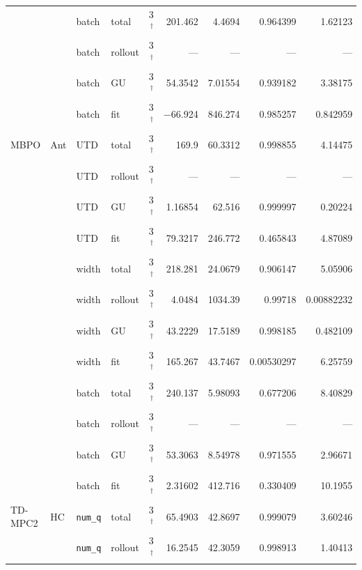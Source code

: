 {\begin{longtable}{@{}llllrrrrr@{}}
     &  & batch & total & \num{3}$^{\dagger}$ & \num{201.462} & \num{4.4694} & \num{0.964399} & \num{1.62123} \\
     &  & batch & rollout & \num{3}$^{\dagger}$ & --- & --- & --- & --- \\
     &  & batch & GU & \num{3}$^{\dagger}$ & \num{54.3542} & \num{7.01554} & \num{0.939182} & \num{3.38175} \\
     &  & batch & fit & \num{3}$^{\dagger}$ & \num{-66.924} & \num{846.274} & \num{0.985257} & \num{0.842959} \\
    MBPO & Ant & UTD & total & \num{3}$^{\dagger}$ & \num{169.9} & \num{60.3312} & \num{0.998855} & \num{4.14475} \\
     &  & UTD & rollout & \num{3}$^{\dagger}$ & --- & --- & --- & --- \\
     &  & UTD & GU & \num{3}$^{\dagger}$ & \num{1.16854} & \num{62.516} & \num{0.999997} & \num{0.20224} \\
     &  & UTD & fit & \num{3}$^{\dagger}$ & \num{79.3217} & \num{246.772} & \num{0.465843} & \num{4.87089} \\
     &  & width & total & \num{3}$^{\dagger}$ & \num{218.281} & \num{24.0679} & \num{0.906147} & \num{5.05906} \\
     &  & width & rollout & \num{3}$^{\dagger}$ & \num{4.0484} & \num{1034.39} & \num{0.99718} & \num{0.00882232} \\
     &  & width & GU & \num{3}$^{\dagger}$ & \num{43.2229} & \num{17.5189} & \num{0.998185} & \num{0.482109} \\
     &  & width & fit & \num{3}$^{\dagger}$ & \num{165.267} & \num{43.7467} & \num{0.00530297} & \num{6.25759} \\
     &  & batch & total & \num{3}$^{\dagger}$ & \num{240.137} & \num{5.98093} & \num{0.677206} & \num{8.40829} \\
     &  & batch & rollout & \num{3}$^{\dagger}$ & --- & --- & --- & --- \\
     &  & batch & GU & \num{3}$^{\dagger}$ & \num{53.3063} & \num{8.54978} & \num{0.971555} & \num{2.96671} \\
     &  & batch & fit & \num{3}$^{\dagger}$ & \num{2.31602} & \num{412.716} & \num{0.330409} & \num{10.1955} \\
    \midrule
    TD-MPC2 & HC & \texttt{num\_\allowbreak q} & total & \num{3}$^{\dagger}$ & \num{65.4903} & \num{42.8697} & \num{0.999079} & \num{3.60246} \\
     &  & \texttt{num\_\allowbreak q} & rollout & \num{3}$^{\dagger}$ & \num{16.2545} & \num{42.3059} & \num{0.998913} & \num{1.40413} \\

\end{longtable}}
